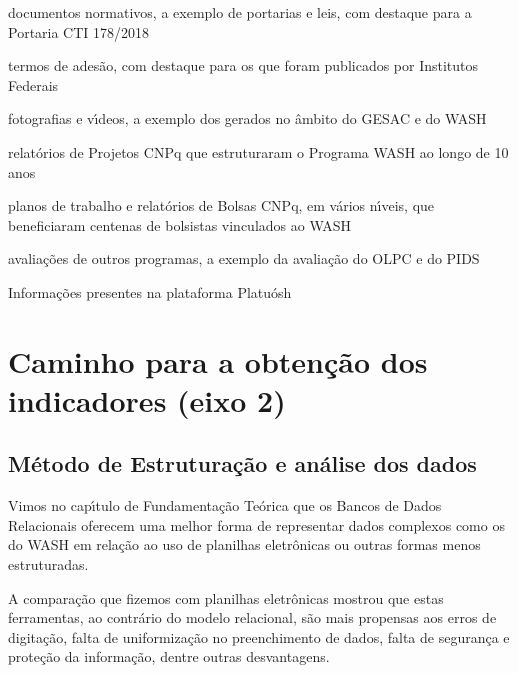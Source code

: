 \documentclass[
12pt,		%
openright,	%
twoside,  %
a4paper,			%
chapter=TITLE,		%
english,			%
french,				%
spanish,			%
brazil				%
]{USPSC-classe/USPSC}
\begin{document}
\begin{alineas}
\item documentos normativos, a exemplo de portarias e leis, com destaque para a Portaria CTI 178/2018
\item termos de ades\~ao, com destaque para os que foram publicados por Institutos Federais
\item fotografias e v\'{\i}deos, a exemplo dos gerados no \^ambito do GESAC e do WASH
\item relat\'orios de Projetos CNPq que estruturaram o Programa WASH ao longo de 10 anos
\item planos de trabalho e relat\'orios de Bolsas CNPq, em v\'arios n\'{\i}veis, que beneficiaram centenas de bolsistas vinculados ao WASH
\item avalia\c{c}\~oes de outros programas, a exemplo da avalia\c{c}\~ao do OLPC e do PIDS
\item Informa\c{c}\~oes presentes na plataforma Platu\'osh
\end{alineas}

\section[Caminho para a obten\c{c}\~ao dos indicadores (eixo 2)]{Caminho para a obten\c{c}\~ao dos indicadores (eixo 2)}\label{Caminho para a obten\c{c}\~ao dos indicadores (eixo 2)}
\subsection[M\'etodo de Estrutura\c{c}\~ao e an\'alise dos dados]{M\'etodo de Estrutura\c{c}\~ao e an\'alise dos dados}\label{M\'etodo de Estrutura\c{c}\~ao e an\'alise dos dados}
Vimos no cap\'{\i}tulo de Fundamenta\c{c}\~ao Te\'orica que os Bancos de Dados Relacionais oferecem uma melhor forma de representar dados complexos como os do WASH em rela\c{c}\~ao ao uso de planilhas eletr\^onicas ou outras formas menos estruturadas.

















A compara\c{c}\~ao que fizemos com planilhas eletr\^onicas mostrou que estas ferramentas, ao contr\'ario do modelo relacional, s\~ao mais propensas aos erros de digita\c{c}\~ao, falta de uniformiza\c{c}\~ao no preenchimento de dados, falta de seguran\c{c}a e prote\c{c}\~ao da informa\c{c}\~ao, dentre outras desvantagens.
\end{document}
